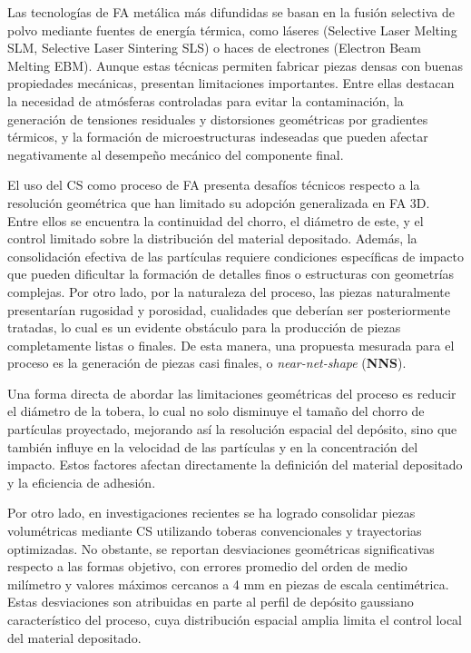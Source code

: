 Las tecnologías de FA metálica más difundidas se basan en la fusión selectiva de polvo mediante fuentes de energía térmica, como láseres (Selective Laser Melting SLM, Selective Laser Sintering SLS) o haces de electrones (Electron Beam Melting EBM)\cite{Herzog2016}. Aunque estas técnicas permiten fabricar piezas densas con buenas propiedades mecánicas, presentan limitaciones importantes. Entre ellas destacan la necesidad de atmósferas controladas para evitar la contaminación, la generación de tensiones residuales y distorsiones geométricas por gradientes térmicos, y la formación de microestructuras indeseadas que pueden afectar negativamente al desempeño mecánico del componente final\cite{Herzog2016}. 

El uso del CS como proceso de FA presenta desafíos técnicos respecto a la resolución geométrica que han limitado su adopción generalizada en FA 3D. Entre ellos se encuentra la continuidad del chorro, el diámetro de este, y el control limitado sobre la distribución del material depositado\cite{Yin2022review}. Además, la consolidación efectiva de las partículas requiere condiciones específicas de impacto que pueden dificultar la formación de detalles finos o estructuras con geometrías complejas. Por otro lado, por la naturaleza del proceso, las piezas naturalmente presentarían rugosidad y porosidad, cualidades que deberían ser posteriormente tratadas, lo cual es un evidente obstáculo para la producción de piezas completamente listas o finales\cite{Moridi2014}. De esta manera, una propuesta mesurada para el proceso es la generación de piezas casi finales, o \textit{near-net-shape} (\textbf{NNS}).

Una forma directa de abordar las limitaciones geométricas del proceso es reducir el diámetro de la tobera, lo cual no solo disminuye el tamaño del chorro de partículas proyectado, mejorando así la resolución espacial del depósito, sino que también influye en la velocidad de las partículas y en la concentración del impacto\cite{Kotoban2017}. Estos factores afectan directamente la definición del material depositado y la eficiencia de adhesión\cite{Sova2013micronozzle}.

Por otro lado, en investigaciones recientes se ha logrado consolidar piezas volumétricas mediante CS utilizando toberas convencionales y trayectorias optimizadas\cite{WU2025642}. No obstante, se reportan desviaciones geométricas significativas respecto a las formas objetivo, con errores promedio del orden de medio milímetro y valores máximos cercanos a 4 mm en piezas de escala centimétrica. Estas desviaciones son atribuidas en parte al perfil de depósito gaussiano característico del proceso, cuya distribución espacial amplia limita el control local del material depositado\cite{Falco2025ColdSA}.

